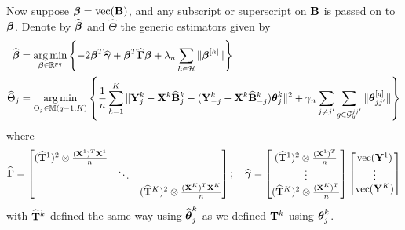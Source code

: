 Now suppose ${\boldsymbol{\beta}} = \operatorname*{vec} ({\mathbf{B}})$, and any subscript or superscript on ${\mathbf{B}}$ is passed on to ${\boldsymbol{\beta}}$. Denote by $\widehat {{\boldsymbol{\beta}}}$ and $\widehat \Theta$ the generic estimators given by
%
\begin{align}
\widehat {{\boldsymbol{\beta}}} &= \operatorname*{arg\,min}_{{\boldsymbol{\beta}} \in {\mathbb{R}}^{pq}} \left\{-2 {\boldsymbol{\beta}}^T \widehat {{\boldsymbol{\gamma}}} + {\boldsymbol{\beta}}^T \widehat {{\boldsymbol{\Gamma}}} {\boldsymbol{\beta}} + \lambda_n \sum_{h \in {\cal{H}}} \| {\boldsymbol{\beta}}^{[h]}  \| \right\} \label{eqn:EstEqn1}\\
\widehat \Theta_j &= \operatorname*{arg\,min}_{\Theta_j \in {\mathbb{M}}(q-1, K)} \left\{ \frac{1}{n} \sum_{k=1}^K \| {\mathbf{Y}}^k_j - {\mathbf{X}}^k \widehat {{\mathbf{B}}}_j^k - ({\mathbf{Y}}_{-j}^k - {\mathbf{X}}^k \widehat {{\mathbf{B}}}^k_{-j} ) {\boldsymbol{\theta}}_j^k \|^2 + \gamma_n \sum_{j \neq j'} \sum_{g \in {\cal{G}}_y^{jj'}} \| {\boldsymbol{\theta}}_{jj'}^{[g]} \| \right\} \label{eqn:EstEqn2}
\end{align}
%
where
%
$$
\widehat {{\boldsymbol{\Gamma}}} = \begin{bmatrix}
(\widehat {{\mathbf{T}}}^1)^2 \otimes \frac{({\mathbf{X}}^1)^T {\mathbf{X}}^1}{n} & &\\
& \ddots &\\
& & (\widehat {{\mathbf{T}}}^K)^2 \otimes \frac{({\mathbf{X}}^K)^T {\mathbf{X}}^K}{n}
\end{bmatrix}; \quad
\widehat {{\boldsymbol{\gamma}}} = \begin{bmatrix}
(\widehat {{\mathbf{T}}}^1)^2 \otimes \frac{({\mathbf{X}}^1)^T}{n}\\
\vdots\\
(\widehat {{\mathbf{T}}}^K)^2 \otimes \frac{({\mathbf{X}}^K)^T}{n}
\end{bmatrix}
\begin{bmatrix}
\operatorname*{vec} ({\mathbf{Y}}^1)\\
\vdots\\
\operatorname*{vec} ({\mathbf{Y}}^K)
\end{bmatrix}
$$
with $\widehat {{\mathbf{T}}}^k$ defined the same way using $\widehat {{\boldsymbol{\theta}}}_j^k$ as we defined ${\mathbf{T}}^k$ using ${\boldsymbol{\theta}}_j^k$.
